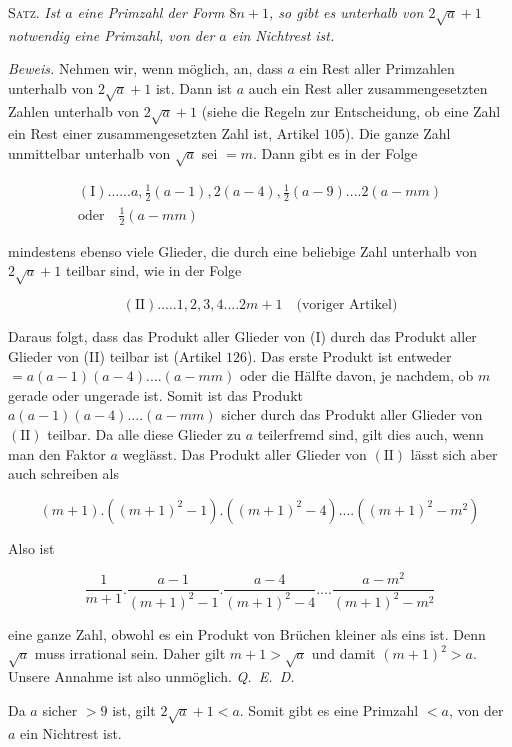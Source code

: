 \textsc{Satz.} \textit{Ist $a$ eine Primzahl der Form $8n+1$, so gibt es unterhalb von $2\surd a+1$ notwendig eine Primzahl, von der $a$ ein Nichtrest ist.}

\textit{Beweis.} Nehmen wir, wenn möglich, an, dass $a$ ein Rest aller Primzahlen unterhalb von $2\surd a+1$ ist. Dann ist $a$ auch ein Rest aller zusammengesetzten Zahlen unterhalb von $2\surd a+1$ (siehe die Regeln zur Entscheidung, ob eine Zahl ein Rest einer zusammengesetzten Zahl ist, Artikel $105$). Die ganze Zahl unmittelbar unterhalb von $\surd a$ sei $=m$. Dann gibt es in der Folge

\[
\begin{gathered}(\mathrm I)......a,\tfrac12(a-1),2(a-4),\tfrac12(a-9)....2(a-mm)\\ \text{oder}\quad\tfrac12(a-mm)\end{gathered}
\]

mindestens ebenso viele Glieder, die durch eine beliebige Zahl unterhalb von $2\surd a+1$ teilbar sind, wie in der Folge

\[
(\mathrm{II}).....1,2,3,4....2m+1\quad\text{(voriger Artikel)}
\]

Daraus folgt, dass das Produkt aller Glieder von (I) durch das Produkt aller Glieder von (II) teilbar ist (Artikel $126$). Das erste Produkt ist entweder \mbox{$=a(a-1)(a-4)....(a-mm)$} oder die Hälfte davon, je nachdem, ob $m$ gerade oder ungerade ist. Somit ist das Produkt $a(a-1)(a-4)....(a-mm)$ sicher durch das Produkt aller Glieder von $(\mathrm{II})$ teilbar. Da alle diese Glieder zu $a$ teilerfremd sind, gilt dies auch, wenn man den Faktor $a$ weglässt. Das Produkt aller Glieder von $(\mathrm{II})$ lässt sich aber auch schreiben als

\[
(m+1).((m+1)^2-1).((m+1)^2-4)....((m+1)^2-m^2)
\]

Also ist

\[
\frac1{m+1}.\frac{a-1}{(m+1)^2-1}.\frac{a-4}{(m+1)^2-4}....\frac{a-m^2}{(m+1)^2-m^2}
\]

eine ganze Zahl, obwohl es ein Produkt von Brüchen kleiner als eins ist. Denn $\surd a$ muss irrational sein. Daher gilt $m+1>\surd a$ und damit $(m+1)^2>a.$ Unsere Annahme ist also unmöglich. \mbox{\textit{Q. E. D.}}

Da $a$ sicher $>9$ ist, gilt $2\surd a+1<a$. Somit gibt es eine Primzahl $<a$, von der $a$ ein Nichtrest ist.
